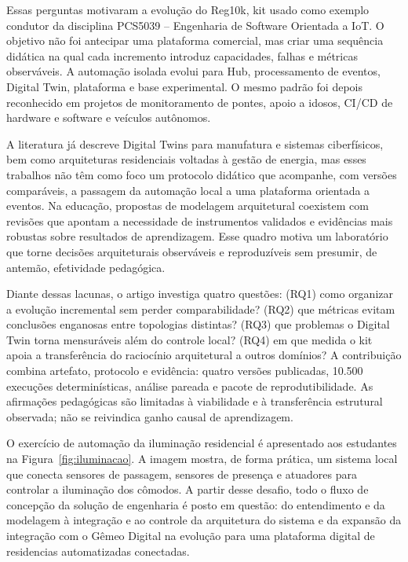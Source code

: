 \documentclass[10pt,a4paper]{article}
\begin{document}
Essas perguntas motivaram a evolução do Reg10k, kit usado como exemplo condutor da disciplina PCS5039 -- Engenharia de Software Orientada a IoT. O objetivo não foi antecipar uma plataforma comercial, mas criar uma sequência didática na qual cada incremento introduz capacidades, falhas e métricas observáveis. A automação isolada evolui para Hub, processamento de eventos, Digital Twin, plataforma e base experimental. O mesmo padrão foi depois reconhecido em projetos de monitoramento de pontes, apoio a idosos, CI/CD de hardware e software e veículos autônomos.

 A literatura já descreve Digital Twins para manufatura e sistemas ciberfísicos, bem como arquiteturas residenciais voltadas à gestão de energia, mas esses trabalhos não têm como foco um protocolo didático que acompanhe, com versões comparáveis, a passagem da automação local a uma plataforma orientada a eventos. \citep{kritzinger2018,tao2019,fujii2022} Na educação, propostas de modelagem arquitetural coexistem com revisões que apontam a necessidade de instrumentos validados e evidências mais robustas sobre resultados de aprendizagem. \citep{brandao2026,harris2026,coombs2026} Esse quadro motiva um laboratório que torne decisões arquiteturais observáveis e reproduzíveis sem presumir, de antemão, efetividade pedagógica.

Diante dessas lacunas, o artigo investiga quatro questões: (RQ1) como organizar a evolução incremental sem perder comparabilidade? (RQ2) que métricas evitam conclusões enganosas entre topologias distintas? (RQ3) que problemas o Digital Twin torna mensuráveis além do controle local? (RQ4) em que medida o kit apoia a transferência do raciocínio arquitetural a outros domínios? A contribuição combina artefato, protocolo e evidência: quatro versões publicadas, 10.500 execuções determinísticas, análise pareada e pacote de reprodutibilidade. As afirmações pedagógicas são limitadas à viabilidade e à transferência estrutural observada; não se reivindica ganho causal de aprendizagem.

O exercício de automação da iluminação residencial é apresentado aos estudantes na Figura~\ref{fig:iluminacao}. A imagem mostra, de forma prática, um sistema local que conecta sensores de passagem, sensores de presença e atuadores para controlar a iluminação dos cômodos. A partir desse desafio, todo o fluxo de concepção da solução de engenharia é posto em questão: do entendimento e da modelagem à integração e ao controle da arquitetura do sistema e da expansão da integração com o Gêmeo Digital na evolução para uma plataforma digital de residencias automatizadas conectadas.
\end{document}
